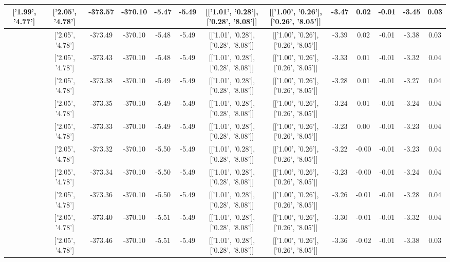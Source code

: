 \begin{table}[htbp]
\begin{adjustbox}{angle=90}
\begin{tabular}{|c|c|c|c|c|c|c|c|c|c|c|c|c|}
 ['1.99', '4.77'] & ['2.05', '4.78'] & -373.57 & -370.10 & -5.47 & -5.49 & [['1.01', '0.28'], ['0.28', '8.08']] & [['1.00', '0.26'], ['0.26', '8.05']] & -3.47 & 0.02 & -0.01 & -3.45 & 0.03\\ \hline
 ['2.00', '4.77'] & ['2.05', '4.78'] & -373.49 & -370.10 & -5.48 & -5.49 & [['1.01', '0.28'], ['0.28', '8.08']] & [['1.00', '0.26'], ['0.26', '8.05']] & -3.39 & 0.02 & -0.01 & -3.38 & 0.03\\ \hline
 ['2.01', '4.77'] & ['2.05', '4.78'] & -373.43 & -370.10 & -5.48 & -5.49 & [['1.01', '0.28'], ['0.28', '8.08']] & [['1.00', '0.26'], ['0.26', '8.05']] & -3.33 & 0.01 & -0.01 & -3.32 & 0.04\\ \hline
 ['2.02', '4.78'] & ['2.05', '4.78'] & -373.38 & -370.10 & -5.49 & -5.49 & [['1.01', '0.28'], ['0.28', '8.08']] & [['1.00', '0.26'], ['0.26', '8.05']] & -3.28 & 0.01 & -0.01 & -3.27 & 0.04\\ \hline
 ['2.03', '4.78'] & ['2.05', '4.78'] & -373.35 & -370.10 & -5.49 & -5.49 & [['1.01', '0.28'], ['0.28', '8.08']] & [['1.00', '0.26'], ['0.26', '8.05']] & -3.24 & 0.01 & -0.01 & -3.24 & 0.04\\ \hline
 ['2.04', '4.78'] & ['2.05', '4.78'] & -373.33 & -370.10 & -5.49 & -5.49 & [['1.01', '0.28'], ['0.28', '8.08']] & [['1.00', '0.26'], ['0.26', '8.05']] & -3.23 & 0.00 & -0.01 & -3.23 & 0.04\\ \hline
 ['2.06', '4.78'] & ['2.05', '4.78'] & -373.32 & -370.10 & -5.50 & -5.49 & [['1.01', '0.28'], ['0.28', '8.08']] & [['1.00', '0.26'], ['0.26', '8.05']] & -3.22 & -0.00 & -0.01 & -3.23 & 0.04\\ \hline
 ['2.07', '4.79'] & ['2.05', '4.78'] & -373.34 & -370.10 & -5.50 & -5.49 & [['1.01', '0.28'], ['0.28', '8.08']] & [['1.00', '0.26'], ['0.26', '8.05']] & -3.23 & -0.00 & -0.01 & -3.24 & 0.04\\ \hline
 ['2.08', '4.79'] & ['2.05', '4.78'] & -373.36 & -370.10 & -5.50 & -5.49 & [['1.01', '0.28'], ['0.28', '8.08']] & [['1.00', '0.26'], ['0.26', '8.05']] & -3.26 & -0.01 & -0.01 & -3.28 & 0.04\\ \hline
 ['2.09', '4.79'] & ['2.05', '4.78'] & -373.40 & -370.10 & -5.51 & -5.49 & [['1.01', '0.28'], ['0.28', '8.08']] & [['1.00', '0.26'], ['0.26', '8.05']] & -3.30 & -0.01 & -0.01 & -3.32 & 0.04\\ \hline
 ['2.10', '4.79'] & ['2.05', '4.78'] & -373.46 & -370.10 & -5.51 & -5.49 & [['1.01', '0.28'], ['0.28', '8.08']] & [['1.00', '0.26'], ['0.26', '8.05']] & -3.36 & -0.02 & -0.01 & -3.38 & 0.03\\ \hline

\end{tabular}
\end{adjustbox}
\end{table}
